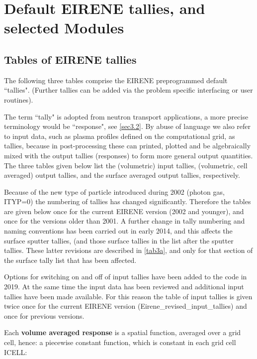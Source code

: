 \chapter{Default EIRENE tallies, and selected Modules}\label{sec.tables-modules}

\section{Tables of EIRENE tallies}\label{sec.tables}

The following three tables comprise the EIRENE preprogrammed default
``tallies".
(Further tallies can be added via the problem specific interfacing or user
routines).

The term ``tally" is adopted from neutron transport applications, a more
precise terminology would be ``response", see \cref{sec3.2}.
By abuse of language we also refer to input data, such as plasma profiles
defined on the computational grid, as tallies, because in post-processing these
can printed, plotted and be algebraically mixed with the output tallies
(responses) to form more general output quantities.
The three tables given below list the (volumetric) input tallies, (volumetric,
cell averaged) output tallies, and the surface averaged output tallies,
respectively.

Because of the new type of particle introduced during 2002 (photon gas, ITYP=0)
the numbering of tallies has changed significantly.
Therefore the tables are given below once for the current EIRENE version (2002
and younger), and once for the versions older than 2001.
A further change in tally numbering and naming conventions has been carried out
in early 2014, and this affects the surface sputter tallies, (and those surface
tallies in the list after the sputter tallies.
These latter revisions are described in \cref{tab3a}, and only for that section
of the surface tally list that has been affected.

Options for switching on and off of input tallies have been added to the code 
in 2019. 
At the same time the input data has been reviewed and additional input tallies
have been made available.
For this reason the table of input tallies is given twice once for the current
EIRENE version (Eirene\_revised\_input\_tallies) and once for previous versions.

\vspace{1em}

Each \textbf{volume averaged response} is a spatial function, averaged over a
grid cell, hence: a piecewise constant function, which is constant in each grid
cell ICELL:

